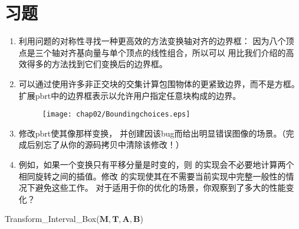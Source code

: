 \section{习题}\label{sec:习题02}

\begin{enumerate}
    \item \circleone 利用问题的对称性寻找一种更高效的方法变换轴对齐的边界框：
          因为八个顶点是三个轴对齐基向量与单个顶点的线性组合，所以可以
          用比我们介绍的高效得多的方法\citep{10.5555/90767.90922}找到它们变换后的边界框。
    \item \circletwo 可以通过使用许多非正交块的交集计算包围物体的更紧致边界，而不是方框。
          扩展pbrt中的边界框表示以允许用户指定任意块构成的边界。
          \begin{figure}[htb]
              \centering\texttt{[image: chap02/Boundingchoices.eps]}
          \end{figure}
    \item \circleone 修改pbrt使其像那样变换，
          并创建因该bug而给出明显错误图像的场景。（完成后别忘了从你的源码拷贝中清除该修改！）
    \item \circletwo 例如，如果一个变换只有平移分量是时变的，则
          的实现会不必要地计算两个相同旋转之间的插值。修改
          的实现使其在不需要当前实现中完整一般性的情况下避免这些工作。
          对于适用于你的优化的场景，你观察到了多大的性能变化？
\end{enumerate}

\begin{algorithm}[htb]
    \SetAlgoNoLine
    \caption{Transform\_Interval\_Box($\bm M,\bm T,\bm A,\bm B$)}
\end{algorithm}